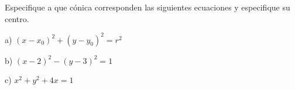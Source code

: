 \bigskip


\vspace{0.25cm}
\begin{exercise}
\item
Especifique a que cónica corresponden las siguientes ecuaciones y especifique su centro.

\bigskip



a) $ (x-x_0)^2 + (y-y_0)^2=r^2$

b) $ (x-2)^2 - (y-3)^2=1$

c) $ x^2 +y^2 + 4x=1$
\end{exercise}

\newpage

